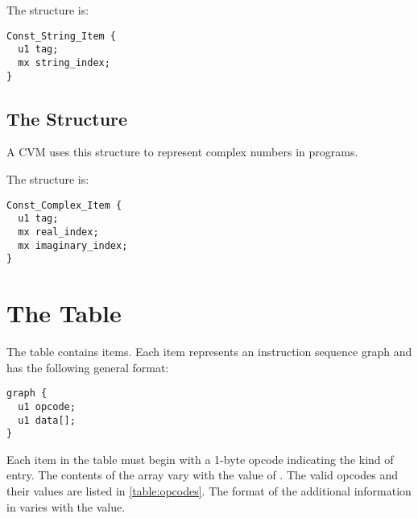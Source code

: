 The  structure is:

\begin{minipage}{\linewidth}
\begin{lstlisting}
Const_String_Item {
  u1 tag;
  mx string_index;
}
\end{lstlisting}
\end{minipage}






\subsection{The  Structure}

A CVM uses this structure to represent complex numbers in programs. 

The  structure is:

\begin{minipage}{\linewidth}
\begin{lstlisting}
Const_Complex_Item {
  u1 tag;
  mx real_index;
  mx imaginary_index;
}
\end{lstlisting}
\end{minipage}





\section{The  Table}

The  table contains  items. Each item represents an instruction sequence graph and has the following general format:

\begin{minipage}{\linewidth}
\begin{lstlisting}
graph {
  u1 opcode;
  u1 data[];
}
\end{lstlisting}
\end{minipage}

Each item in the  table must begin with a 1-byte opcode indicating the kind of  entry. The contents of the  array vary with the value of . The valid opcodes and their values are listed in \autoref{table:opcodes}. The format of the additional information in  varies with the  value. 

